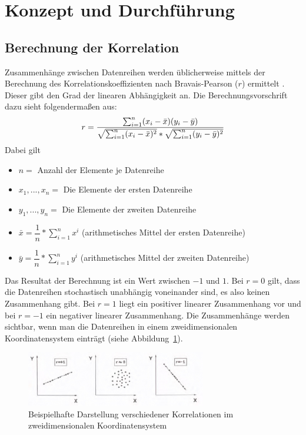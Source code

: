 \documentclass[da,ngerman]{stthesis}
\begin{document}
  		\section{Konzept und Durchführung}
  			\subsection{Berechnung der Korrelation}
  				Zusammenhänge zwischen Datenreihen werden üblicherweise mittels der Berechnung des Korrelationskoeffizienten nach Bravais-Pearson ($r$) ermittelt \cite{Korrelation}. Dieser gibt den Grad der linearen Abhängigkeit an. Die Berechnungsvorschrift dazu sieht folgendermaßen aus:
  				\begin{equation}
					\Large{r = \dfrac{\sum_{i=1}^{n}(x_i - \bar{x})(y_i - \bar{y})}{\sqrt{\sum_{i=1}^{n}(x_i - \bar{x})^2} * \sqrt{\sum_{i=1}^{n}(y_i - \bar{y})^2}}}
				\end{equation}
				Dabei gilt 
				\begin{itemize}
					\item $n =$ Anzahl der Elemente je Datenreihe
					\item $x_1,... ,x_n =$ Die Elemente der ersten Datenreihe
					\item $y_1,... ,y_n =$ Die Elemente der zweiten Datenreihe
					\item $\bar{x} = \dfrac{1}{n} * \sum_{i=1}^{n}x^i$ (arithmetisches Mittel der ersten Datenreihe)
					\item $\bar{y} = \dfrac{1}{n} * \sum_{i=1}^{n}y^i$ (arithmetisches Mittel der zweiten Datenreihe)
				\end{itemize}
				Das Resultat der Berechnung ist ein Wert zwischen $-1$ und $1$. Bei $r=0$ gilt, dass die Datenreihen stochastisch unabhängig voneinander sind, es also keinen Zusammenhang gibt. Bei $r=1$ liegt ein positiver linearer Zusammenhang vor und bei $r=-1$ ein negativer linearer Zusammenhang. Die Zusammenhänge werden sichtbar, wenn man die Datenreihen in einem zweidimensionalen Koordinatensystem einträgt (siehe Abbildung~\ref{sample}). \newline
				\begin{figure} [h]
					\centering
					\includegraphics [width=0.7\textwidth] {sample.jpg}
					\caption{Beispielhafte Darstellung verschiedener Korrelationen im zweidimensionalen Koordinatensystem \cite{WasKorrel}}
					\label{sample}
				\end{figure}
\end{document}
